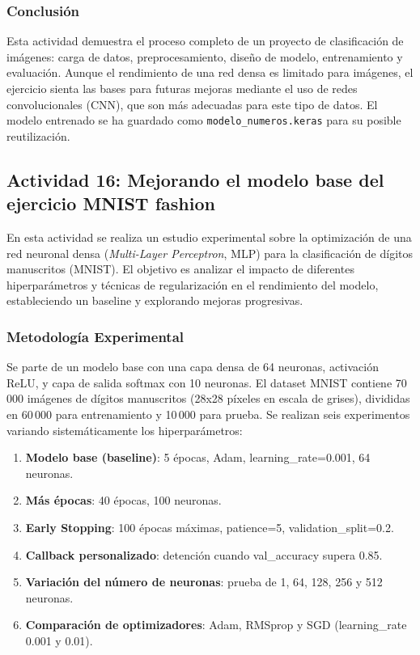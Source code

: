 \documentclass[12pt]{article}
\begin{document}
\subsubsection*{Conclusión}

Esta actividad demuestra el proceso completo de un proyecto de clasificación de imágenes: carga de datos, preprocesamiento, diseño de modelo, entrenamiento y evaluación. Aunque el rendimiento de una red densa es limitado para imágenes, el ejercicio sienta las bases para futuras mejoras mediante el uso de redes convolucionales (CNN), que son más adecuadas para este tipo de datos. El modelo entrenado se ha guardado como \texttt{modelo\_numeros.keras} para su posible reutilización.

\subsection{Actividad 16: Mejorando el modelo base del ejercicio MNIST fashion}

En esta actividad se realiza un estudio experimental sobre la optimización de una red neuronal densa (\textit{Multi-Layer Perceptron}, MLP) para la clasificación de dígitos manuscritos (MNIST). El objetivo es analizar el impacto de diferentes hiperparámetros y técnicas de regularización en el rendimiento del modelo, estableciendo un baseline y explorando mejoras progresivas.

\subsubsection*{Metodología Experimental}

Se parte de un modelo base con una capa densa de 64 neuronas, activación ReLU, y capa de salida softmax con 10 neuronas. El dataset MNIST contiene 70\,000 imágenes de dígitos manuscritos (28x28 píxeles en escala de grises), divididas en 60\,000 para entrenamiento y 10\,000 para prueba. Se realizan seis experimentos variando sistemáticamente los hiperparámetros:

\begin{enumerate}
    \item \textbf{Modelo base (baseline)}: 5 épocas, Adam, learning\_rate=0.001, 64 neuronas.
    \item \textbf{Más épocas}: 40 épocas, 100 neuronas.
    \item \textbf{Early Stopping}: 100 épocas máximas, patience=5, validation\_split=0.2.
    \item \textbf{Callback personalizado}: detención cuando val\_accuracy supera 0.85.
    \item \textbf{Variación del número de neuronas}: prueba de 1, 64, 128, 256 y 512 neuronas.
    \item \textbf{Comparación de optimizadores}: Adam, RMSprop y SGD (learning\_rate 0.001 y 0.01).
\end{enumerate}
\end{document}
